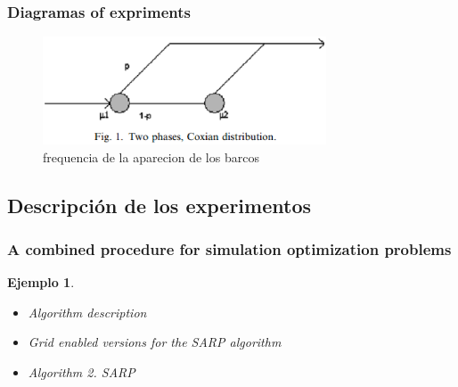 \documentclass{beamer}
\newtheorem{ejemplo}{Ejemplo}
\begin{document}
\begin{frame}
\frametitle{Diagramas of expriments }
\begin{figure}[!th]
\begin{center}
\includegraphics[width=0.75\textwidth]{img/queu.eps}
\caption{frequencia de la aparecion de los barcos}
\label{fig:1}
\end{center}
\end{figure}
\end{frame}

\subsection{Descripción de los experimentos}

\begin{frame}
\frametitle{A combined procedure for simulation optimization problems}

\begin{ejemplo}
  \begin{itemize}
    \item <1-> Algorithm description 
    \item <2-> Grid enabled versions for the SARP algorithm 
    \item <3> Algorithm 2. SARP 
  \end{itemize}
\end{ejemplo}

\end{frame}
\end{document}
